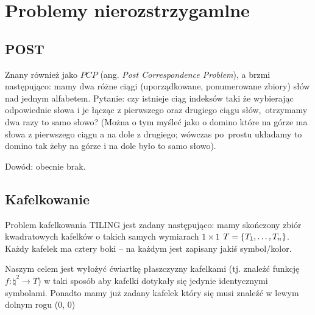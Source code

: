 \section{Problemy nierozstrzygamlne}

\subsection{POST}

Znany również jako \(PCP\) (ang. \textit{Post Correspondence Problem}), a brzmi następująco: mamy dwa różne ciągi (uporządkowane, ponumerowane zbiory) słów nad jednym alfabetem. Pytanie: czy istnieje ciąg indeksów taki że wybierając odpowiednie słowa i je łącząc z pierwszego oraz drugiego ciągu słów,\
otrzymamy dwa razy to samo słowo? (Można o tym myśleć jako o domino które na górze ma słowa z pierwszego ciągu a na dole z drugiego; wówczas po\
prostu układamy to domino tak żeby na górze i na dole było to samo słowo).

Dowód: obecnie brak.

\subsection{Kafelkowanie}

Problem kafelkowania \textsc{TILING} jest zadany następująco: mamy skończony zbiór kwadratowych kafelków o takich samych wymiarach \( 1 \times 1 \) \( T = \set{T_1, \dots, T_n} \).
Każdy kafelek ma cztery boki -- na każdym jest zapisany jakiś symbol/kolor.

Naszym celem jest wyłożyć ćwiartkę płaszczyzny kafelkami (tj. znaleźć funkcję \( f : \natural^2 \rightarrow T \)) w taki sposób aby kafelki dotykały się jedynie identycznymi symbolami. Ponadto mamy już zadany kafelek który się musi znaleźć w lewym dolnym rogu (0, 0)


